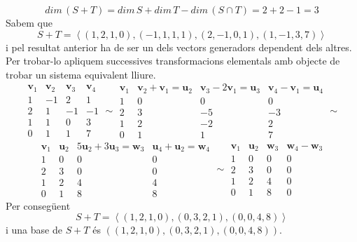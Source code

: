 \begin{solucio}
\begin{equation*}
dim\,(S+T)=dim\,S+dim\,T-dim\,(S%
\cap T)=2+2-1=3
\end{equation*}%
Sabem que%
\begin{equation*}
S+T=\left\langle
(1,2,1,0),(-1,1,1,1),(2,-1,0,1),(1,-1,3,7)\right\rangle
\end{equation*}%
i pel resultat anterior ha de ser un dels vectors generadors
dependent dels altres. Per trobar-lo apliquem successives
transformacions elementals amb objecte de trobar un sistema equivalent
lliure.%
\begin{equation*}
\begin{array}{cccc}
\mathbf{v}_{1} & \mathbf{v}_{2} & \mathbf{v}_{3} & \mathbf{v}_{4} \\ 
1 & -1 & 2 & 1 \\ 
2 & 1 & -1 & -1 \\ 
1 & 1 & 0 & 3 \\ 
0 & 1 & 1 & 7%
\end{array}%
\sim 
\begin{array}{cccc}
\mathbf{v}_{1} & \mathbf{v}_{2}+\mathbf{v}_{1}=\mathbf{u}_{2} & \mathbf{v}%
_{3}-2\mathbf{v}_{1}=\mathbf{u}_{3} & \mathbf{v}_{4}-\mathbf{v}_{1}=\mathbf{u%
}_{4} \\ 
1 & 0 & 0 & 0 \\ 
2 & 3 & -5 & -3 \\ 
1 & 2 & -2 & 2 \\ 
0 & 1 & 1 & 7%
\end{array}%
\sim
\end{equation*}%
\begin{equation*}
\begin{array}{cccc}
\mathbf{v}_{1} & \mathbf{u}_{2} & 5\mathbf{u}_{2}+3\mathbf{u}_{3}=\mathbf{w}%
_{3} & \mathbf{u}_{4}+\mathbf{u}_{2}=\mathbf{w}_{4} \\ 
1 & 0 & 0 & 0 \\ 
2 & 3 & 0 & 0 \\ 
1 & 2 & 4 & 4 \\ 
0 & 1 & 8 & 8%
\end{array}%
\sim 
\begin{array}{cccc}
\mathbf{v}_{1} & \mathbf{u}_{2} & \mathbf{w}_{3} & \mathbf{w}_{4}-\mathbf{w}%
_{3} \\ 
1 & 0 & 0 & 0 \\ 
2 & 3 & 0 & 0 \\ 
1 & 2 & 4 & 0 \\ 
0 & 1 & 8 & 0%
\end{array}%
\end{equation*}%
Per consegüent%
\begin{equation*}
S+T=\left\langle (1,2,1,0),(0,3,2,1),(0,0,4,8)\right\rangle
\end{equation*}%
i una base de $S+T$ és $((1,2,1,0),(0,3,2,1),(0,0,4,8))$.
\end{solucio}

